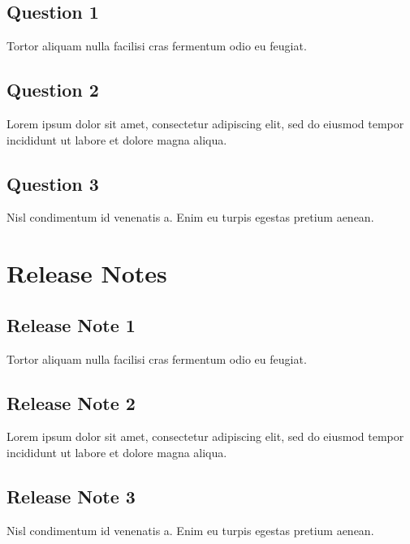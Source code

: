 \documentclass[letterpaper,10pt,english]{sphinxmanual}
\begin{document}
\section{Question 1}
\label{\detokenize{FAQs:question-1}}
\sphinxAtStartPar
Tortor aliquam nulla facilisi cras fermentum odio eu feugiat.


\section{Question 2}
\label{\detokenize{FAQs:question-2}}
\sphinxAtStartPar
Lorem ipsum dolor sit amet, consectetur adipiscing elit, sed do eiusmod tempor incididunt ut labore et dolore magna aliqua.


\section{Question 3}
\label{\detokenize{FAQs:question-3}}
\sphinxAtStartPar
Nisl condimentum id venenatis a. Enim eu turpis egestas pretium aenean.

\sphinxstepscope


\chapter{Release Notes}
\label{\detokenize{release_notes:release-notes}}\label{\detokenize{release_notes::doc}}

\section{Release Note 1}
\label{\detokenize{release_notes:release-note-1}}
\sphinxAtStartPar
Tortor aliquam nulla facilisi cras fermentum odio eu feugiat.


\section{Release Note 2}
\label{\detokenize{release_notes:release-note-2}}
\sphinxAtStartPar
Lorem ipsum dolor sit amet, consectetur adipiscing elit, sed do eiusmod tempor incididunt ut labore et dolore magna aliqua.


\section{Release Note 3}
\label{\detokenize{release_notes:release-note-3}}
\sphinxAtStartPar
Nisl condimentum id venenatis a. Enim eu turpis egestas pretium aenean.
\end{document}
